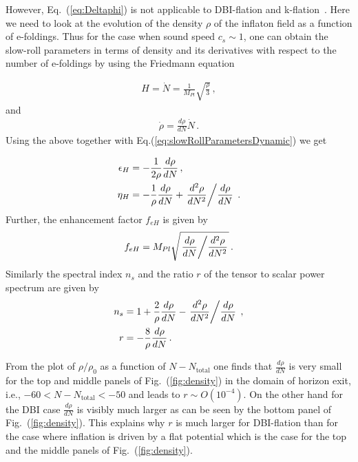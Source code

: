 \documentclass[12pt]{article}
\begin{document}
However, Eq.~(\ref{eq:Deltaphi}) is not applicable to DBI-flation and k-flation~\cite{Garriga:1999vw}.
Here we need to look at the evolution of the density $\rho$ of the inflaton field as a function of e-foldings.
Thus for the case when sound speed $c_s \sim 1$, one can obtain the slow-roll parameters in terms of density and its derivatives with respect to the number of e-foldings by using the Friedmann equation

\begin{align}
H= \dot N= \frac{1}{M_{Pl}} \sqrt{\frac{\rho}{3}}\,,
\end{align}
and 
\begin{align}
\dot \rho= \frac{d\rho}{dN} \dot N\,.
\end{align}
Using the above together with Eq.(\ref{eq:slowRollParametersDynamic}) we get 

\begin{equation}
  \begin{aligned}
    \epsilon_H &= -\frac{1}{2 \rho} \frac{d\rho}{dN}\,,\\
    \eta_H &= -\frac{1}{\rho} \frac{d\rho}{dN} + \left.\frac{d^2\rho}{dN^2} \middle/ \frac{d\rho}{dN}\right.\,.
  \end{aligned}
\end{equation}
Further, the enhancement factor $f_{eH}$ is given by
\begin{equation}
  f_{eH} = M_{Pl} \sqrt{\left.\frac{d\rho}{dN} \middle/ \frac{d^2\rho}{dN^2}\right.}\,.
\end{equation}
Similarly the spectral index $n_s$ and the ratio $r$ of the tensor to scalar power spectrum are given by
\begin{equation} \label{eq:rFromDDensityDN}
  \begin{aligned}
    n_s &= 1 + \frac{2}{\rho} \frac{d\rho}{dN} - \left.\frac{d^2\rho}{dN^2} \middle/ \frac{d\rho}{dN}\right.\,,\\
    r &= - \frac{8}{\rho} \frac{d\rho}{dN}\,.
  \end{aligned}
\end{equation}

From the plot of $\rho / \rho_0$ as a function of $N - N_{\text{total}}$ one finds that $\frac{d\rho}{dN}$ is very small for the top and middle panels of Fig.~(\ref{fig:density}) in the domain of horizon exit, i.e., $-60 < N - N_\text{total} < -50$ and leads to $r \sim O\left(10^{-4}\right)$.
On the other hand for the DBI case $\frac{d\rho}{dN}$ is visibly much larger as can be seen by the bottom panel of Fig.~(\ref{fig:density}).
This explains why $r$ is much larger for DBI-flation than for the case where inflation is driven by a flat potential which is the case for the top and the middle panels of Fig.~(\ref{fig:density}).
\end{document}
